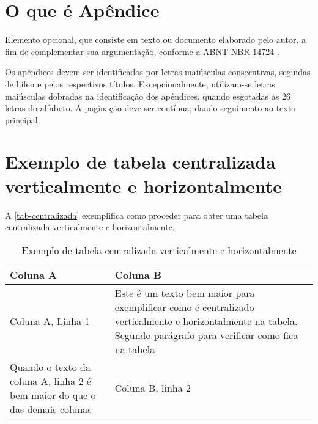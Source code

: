 
\begin{apendicesenv}

 
\chapter{O que é Apêndice}
\vfill
\clearpage

Elemento opcional, que consiste em texto ou documento elaborado pelo autor, a fim de complementar sua argumentação, conforme a ABNT NBR 14724 \cite{nbr14724}.

Os apêndices devem ser identificados por letras maiúsculas consecutivas, seguidas de hífen e pelos respectivos títulos. Excepcionalmente, utilizam-se letras maiúsculas dobradas na identificação dos apêndices, quando esgotadas as 26 letras do alfabeto. A paginação deve ser contínua, dando seguimento ao texto principal. \cite{aguia2020}
\chapter{Exemplo de tabela centralizada verticalmente e horizontalmente}
\vfill
\clearpage
{}A \autoref{tab-centralizada} exemplifica como proceder para obter uma tabela centralizada verticalmente e horizontalmente.
\begin{table}[h]
\ABNTEXfontereduzida
\caption[Exemplo de tabela centralizada verticalmente e horizontalmente]{Exemplo de tabela centralizada verticalmente e horizontalmente}
\label{tab-centralizada}

\begin{tabular}{ >{\centering\arraybackslash}m{6cm}  >{\centering\arraybackslash}m{6cm} }

\hline
 \centering \textbf{Coluna A} & \textbf{Coluna B}\\
\hline
  Coluna A, Linha 1 & Este é um texto bem maior para exemplificar como é centralizado verticalmente e horizontalmente na tabela. Segundo parágrafo para verificar como fica na tabela\\
  Quando o texto da coluna A, linha 2 é bem maior do que o das demais colunas  & Coluna B, linha 2\\
\hline
\end{tabular}
\end{table}

\end{apendicesenv}
